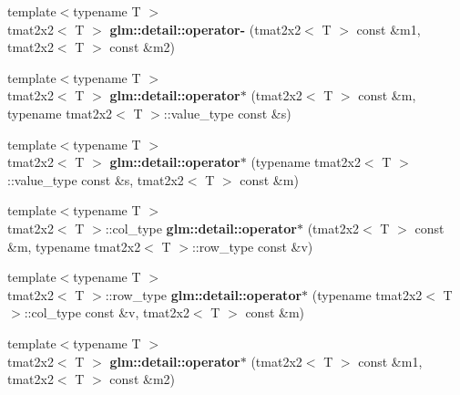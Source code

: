 \begin{DoxyCompactItemize}
\item 
\hypertarget{namespaceglm_1_1detail_a1331bdaa549c5d383676677caed94708}{{\footnotesize template$<$typename T $>$ }\\tmat2x2$<$ \-T $>$ {\bfseries glm\-::detail\-::operator-\/} (tmat2x2$<$ \-T $>$ const \&m1, tmat2x2$<$ \-T $>$ const \&m2)}\label{namespaceglm_1_1detail_a1331bdaa549c5d383676677caed94708}

\item 
\hypertarget{namespaceglm_1_1detail_a71389ec1993200afb31c2502b136c8e3}{{\footnotesize template$<$typename T $>$ }\\tmat2x2$<$ \-T $>$ {\bfseries glm\-::detail\-::operator$\ast$} (tmat2x2$<$ \-T $>$ const \&m, typename tmat2x2$<$ \-T $>$\-::value\-\_\-type const \&s)}\label{namespaceglm_1_1detail_a71389ec1993200afb31c2502b136c8e3}

\item 
\hypertarget{namespaceglm_1_1detail_a6680ff04df7834913775c1322999f2ec}{{\footnotesize template$<$typename T $>$ }\\tmat2x2$<$ \-T $>$ {\bfseries glm\-::detail\-::operator$\ast$} (typename tmat2x2$<$ \-T $>$\-::value\-\_\-type const \&s, tmat2x2$<$ \-T $>$ const \&m)}\label{namespaceglm_1_1detail_a6680ff04df7834913775c1322999f2ec}

\item 
\hypertarget{namespaceglm_1_1detail_a2a27c3fd59a69cb1ca766160249543ee}{{\footnotesize template$<$typename T $>$ }\\tmat2x2$<$ \-T $>$\-::col\-\_\-type {\bfseries glm\-::detail\-::operator$\ast$} (tmat2x2$<$ \-T $>$ const \&m, typename tmat2x2$<$ \-T $>$\-::row\-\_\-type const \&v)}\label{namespaceglm_1_1detail_a2a27c3fd59a69cb1ca766160249543ee}

\item 
\hypertarget{namespaceglm_1_1detail_a8feedbf6a8c4840374a590fa755fcf2e}{{\footnotesize template$<$typename T $>$ }\\tmat2x2$<$ \-T $>$\-::row\-\_\-type {\bfseries glm\-::detail\-::operator$\ast$} (typename tmat2x2$<$ \-T $>$\-::col\-\_\-type const \&v, tmat2x2$<$ \-T $>$ const \&m)}\label{namespaceglm_1_1detail_a8feedbf6a8c4840374a590fa755fcf2e}

\item 
\hypertarget{namespaceglm_1_1detail_a7d9d595a2fffb02caa2055f869a14ab3}{{\footnotesize template$<$typename T $>$ }\\tmat2x2$<$ \-T $>$ {\bfseries glm\-::detail\-::operator$\ast$} (tmat2x2$<$ \-T $>$ const \&m1, tmat2x2$<$ \-T $>$ const \&m2)}\label{namespaceglm_1_1detail_a7d9d595a2fffb02caa2055f869a14ab3}


\end{DoxyCompactItemize}
